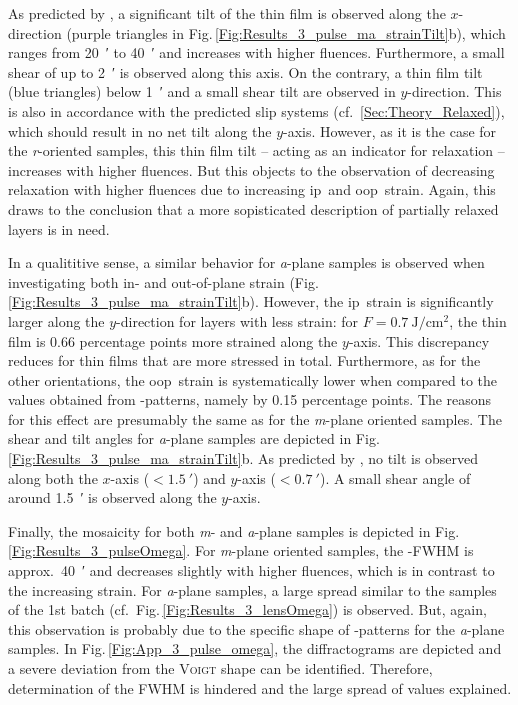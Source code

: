 As predicted by \textcite{kneiss2021}, a significant tilt of the thin film is observed along the $x$-direction (purple triangles in Fig.\,\ref{Fig:Results_3_pulse_ma_strainTilt}b), which ranges from \qty{20}{\arcminute} to \qty{40}{\arcminute} and increases with higher fluences.
Furthermore, a small shear of up to \qty{2}{\arcminute} is observed along this axis.
On the contrary, a thin film tilt (blue triangles) below \qty{1}{\arcminute} and a small shear tilt are observed in $y$-direction.
This is also in accordance with the predicted slip systems (cf.~\ref{Sec:Theory_Relaxed}), which should result in no net tilt along the $y$-axis.
However, as it is the case for the \textit{r}-oriented samples, this thin film tilt -- acting as an indicator for relaxation -- increases with higher fluences.
But this objects to the observation of decreasing relaxation with higher fluences due to increasing \gls{ip}\ and \gls{oop}\ strain. 
Again, this draws to the conclusion that a more sopisticated description of partially relaxed layers is in need.

In a qualititive sense, a similar behavior for \textit{a}-plane samples is observed when investigating both in- and out-of-plane strain (Fig.\,\ref{Fig:Results_3_pulse_ma_strainTilt}b).
However, the \gls{ip}\ strain is significantly larger along the $y$-direction for layers with less strain:
for $F=\qty{0.7}{\J\per\cm\squared}$, the thin film is 0.66 percentage points more strained along the $y$-axis.
This discrepancy reduces for thin films that are more stressed in total.
Furthermore, as for the other orientations, the \gls{oop}\ strain is systematically lower when compared to the values obtained from \thetaomega-patterns, namely by 0.15 percentage points.
The reasons for this effect are presumably the same as for the \textit{m}-plane oriented samples.
The shear and tilt angles for \textit{a}-plane samples are depicted in Fig.\,\ref{Fig:Results_3_pulse_ma_strainTilt}b.
As predicted by \textcite{kneiss2021}, no tilt is observed along both the $x$-axis ($<\qty{1.5}{\arcminute}$) and $y$-axis ($<\qty{0.7}{\arcminute}$).
A small shear angle of around \qty{1.5}{\arcminute} is observed along the $y$-axis.

Finally, the mosaicity for both \textit{m}- and \textit{a}-plane samples is depicted in Fig.\,\ref{Fig:Results_3_pulseOmega}.
For \textit{m}-plane oriented samples, the \textomega-FWHM is approx.\ \qty{40}{\arcminute} and decreases slightly with higher fluences, which is in contrast to the increasing strain.
For \textit{a}-plane samples, a large spread similar to the samples of the 1st batch (cf.\ Fig.\,\ref{Fig:Results_3_lensOmega}) is observed.
But, again, this observation is probably due to the specific shape of \textomega-patterns for the \textit{a}-plane samples.
In Fig.\,\ref{Fig:App_3_pulse_omega}, the diffractograms are depicted and a severe deviation from the \textsc{Voigt} shape can be identified.
Therefore, determination of the \gls{FWHM} is hindered and the large spread of values explained.